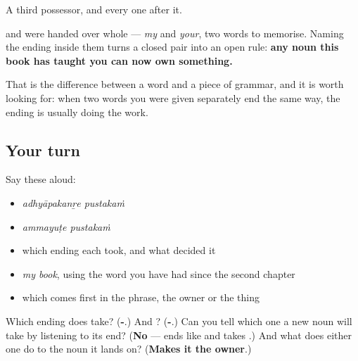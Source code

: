 \begin{grammarlens}[title={What you've built}]
A third possessor, and every one after it.

\textbf{} and \textbf{} were handed over whole — \emph{my} and \emph{your}, two words to memorise. Naming the ending inside them turns a closed pair into an open rule: \textbf{any noun this book has taught you can now own something.}

That is the difference between a word and a piece of grammar, and it is worth looking for: when two words you were given separately end the same way, the ending is usually doing the work.
\end{grammarlens}

\subsection*{Your turn}
Say these aloud:

\begin{itemize}
\raggedright
  \item \emph{adhyāpakanṟe pustakaṁ}
  \item \emph{ammayuṭe pustakaṁ}
  \item which ending each took, and what decided it
  \item \emph{my book}, using the word you have had since the second chapter
  \item which comes first in the phrase, the owner or the thing
\end{itemize}

\begin{tcolorbox}[breakable,colback=teal!4,colframe=teal!35!black,title={Before you move on}]
Which ending does \textbf{} take? (\textbf{-}.) And \textbf{}? (\textbf{-}.) Can you tell which one a new noun will take by listening to its end? (\textbf{No} — \textbf{} ends like \textbf{} and takes \textbf{}.) And what does either one do to the noun it lands on? (\textbf{Makes it the owner}.)
\end{tcolorbox}
